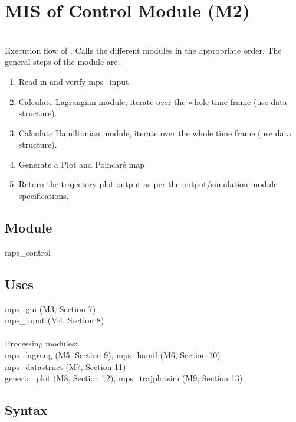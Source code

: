 \documentclass[12pt, titlepage]{article}
\begin{document}
\newpage

\section{MIS of \progname{}Control Module (M2)} \label{Module-Ctrl}


\\

\noindent Execution flow of \progname{}. Calls the different modules in 
the appropriate order.
The general steps of the module are:
\begin{enumerate}
\item Read in and verify mps\_input.
\item Calculate Lagrangian module, iterate over the whole time frame 
(use data structure).
\item Calculate Hamiltonian module, iterate over the whole time frame 
(use data structure).
\item Generate a Plot and Poincar\'{e} map
\item Return the trajectory plot output as per the output/simulation module 
specifications.
\end{enumerate}

\subsection{Module}

mps\_control

\subsection{Uses}

mps\_gui (M3, Section 7)\\
mps\_input (M4, Section 8)\\\\
Processing modules: \\
mps\_lagrang (M5, Section 9), mps\_hamil (M6, Section 10)\\
mps\_datastruct (M7, Section 11)\\
generic\_plot (M8, Section 12), mps\_trajplotsim (M9, Section 13) 

\subsection{Syntax}
\end{document}
